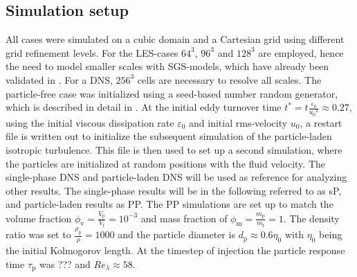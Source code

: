 \documentclass[11pt,a4paper,openany,oneside,parskip=half*]{article}
\begin{document}
\subsection{Simulation setup}
All cases were simulated on a cubic domain and a Cartesian grid using different grid refinement levels. For the LES-cases $64^3$, $96^3$ and $128^3$ are employed, hence the need to model smaller scales with SGS-models, which have already been validated in \cite{ValidationOfParticleLadenLargeEddySimulationUsingHPCSystems}. For a DNS, $256^3$ cells are necessary to resolve all scales.
\newline
The particle-free case was initialized using a seed-based number random generator, which is described in detail in \cite{??? Quelle einfuegen}. At the initial eddy turnover time $t^*=t\frac{\varepsilon_\mathrm{0}}{{u_\mathrm{0}}^2} \approx 0.27$, using the initial viscous dissipation rate $\varepsilon_\mathrm{0}$ and initial rms-velocity $u_\mathrm{0}$, a restart file is written out to initialize the subsequent simulation of the particle-laden isotropic turbulence. This file is then used to set up a second simulation, where the particles are initialized at random positions with the fluid velocity. The single-phase DNS and particle-laden DNS will be used as reference for analyzing other results. The single-phase results will be in the following referred to as sP, and particle-laden results as PP. The PP simulations are set up to match the volume fraction $\phi_\mathrm{v}=\frac{V_\mathrm{p}}{V_\mathrm{f}}= 10^{-3}$ and mass fraction of $\phi_\mathrm{m}=\frac{m_\mathrm{p}}{m_\mathrm{f}}=1$. The density ratio was set to $\frac{\rho_\mathrm{p}}{\rho} = 1000$ and the particle diameter is $d_\mathrm{p} \approx 0.6 \eta_\mathrm{0}$ with $\eta_\mathrm{0}$ being the initial Kolmogorov length. At the timestep of injection the particle response time $\tau_\mathrm{p}$ was ??? and $Re_\lambda \approx 58$. 
\newline
\end{document}
